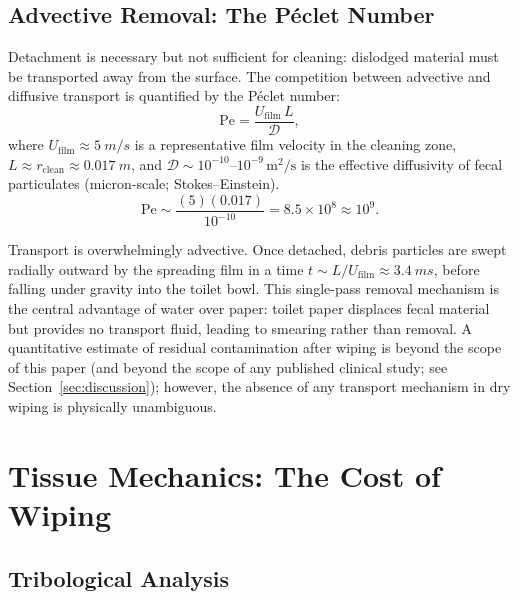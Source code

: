 \documentclass[aps,prfluids,reprint,amsmath,amssymb,floatfix]{revtex4-2}
\newcommand{\Pe}{\mathrm{Pe}}
\begin{document}
\subsection{Advective Removal: The P\'{e}clet Number}
\label{subsec:peclet}

Detachment is necessary but not sufficient for cleaning: dislodged material
must be transported away from the surface. The competition between advective
and diffusive transport is quantified by the P\'{e}clet number:
\begin{equation}
    \Pe = \frac{U_\mathrm{film}\,L}{\mathcal{D}},
    \label{eq:peclet}
\end{equation}
where $U_\mathrm{film} \approx \SI{5}{m/s}$ is a representative film velocity
in the cleaning zone, $L \approx r_\mathrm{clean} \approx \SI{0.017}{m}$,
and $\mathcal{D} \sim 10^{-10}$--$10^{-9}\,\mathrm{m^2/s}$ is the effective
diffusivity of fecal particulates (micron-scale; Stokes--Einstein).
\begin{equation}
    \Pe \sim \frac{(5)(0.017)}{10^{-10}} = 8.5 \times 10^8 \approx 10^9.
    \label{eq:peval}
\end{equation}

Transport is overwhelmingly advective. Once detached, debris particles are
swept radially outward by the spreading film in a time $t \sim L/U_\mathrm{film}
\approx \SI{3.4}{ms}$, before falling under gravity into the toilet bowl.
This single-pass removal mechanism is the central advantage of water over
paper: toilet paper displaces fecal material but provides no transport fluid,
leading to smearing rather than removal. A quantitative estimate of residual
contamination after wiping is beyond the scope of this paper (and beyond
the scope of any published clinical study; see Section~\ref{sec:discussion});
however, the absence of any transport mechanism in dry wiping is physically
unambiguous.

\section{Tissue Mechanics: The Cost of Wiping}
\label{sec:tribology}

\subsection{Tribological Analysis}
\label{subsec:tribology}
\end{document}
